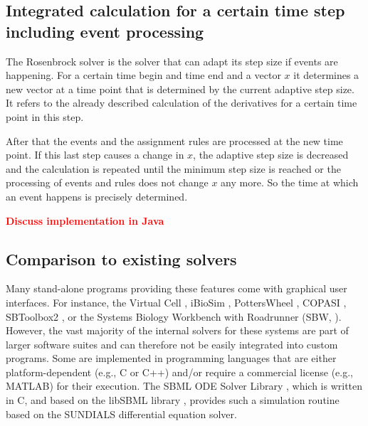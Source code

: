 \documentclass[10pt]{bmc_article}
\newenvironment{bmcformat}{\baselineskip20pt\sloppy\setboolean{publ}{false}}{\baselineskip20pt\sloppy}
\newcommand{\TODO}[1]{\textcolor{red}{\textbf{#1}}}
\begin{document}
\begin{bmcformat}
\subsection{Integrated calculation for a certain time step including event processing}
The Rosenbrock solver is the solver that can adapt its step size if events are happening. For a certain time begin and time end and a vector $x$ it determines a new vector at a time point that is determined by the current adaptive step size. It refers to the already described calculation of the derivatives for a certain time point in this step.

After that the events and the assignment rules are processed at the new time point. If this last step causes a change in $x$, the adaptive step size is decreased and the calculation is repeated until the minimum step size is reached or the processing of events and rules does not change $x$ any more. So the time at which an event happens is precisely determined.

\TODO{Discuss implementation in Java}

\subsection{Comparison to existing solvers}

Many stand-alone programs providing these features come with
graphical user interfaces.
For instance, the Virtual Cell \cite{Loew2001}, iBioSim \cite{Myers2009},
PottersWheel \cite{Maiwald2008}, COPASI \cite{Hoops2006}, SBToolbox2
\cite{SBT_Schmidt2006}, or the Systems Biology Workbench with Roadrunner (SBW, \cite{Bergmann06}). 
However, the vast majority of the internal solvers for these systems are part of
larger software suites and can therefore not be easily integrated into custom
programs. Some are implemented in programming languages that are either
platform-dependent (e.g., C or C++) and/or require a commercial license (e.g.,
MATLAB\texttrademark{}) for their execution.
The SBML ODE Solver Library \cite{Machne2006}, which is written in C,
and based on the libSBML library \cite{Bornstein2008}, 
provides such a simulation routine based on the SUNDIALS differential equation
solver.


\end{bmcformat}
\end{document}
